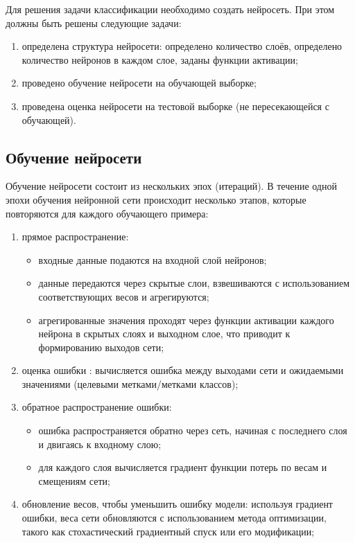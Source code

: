\documentclass[12pt]{report}
\begin{document}
Для решения задачи классификации необходимо создать нейросеть. При этом должны быть решены следующие задачи:
\begin{enumerate}
    \item определена структура нейросети: определено количество слоёв, определено количество нейронов в каждом слое, заданы функции активации;
    \item проведено обучение нейросети на обучающей выборке;
    \item проведена оценка нейросети на тестовой выборке (не пересекающейся с обучающей).
\end{enumerate}

\subsection{Обучение нейросети}

Обучение нейросети состоит из нескольких эпох (итераций). В течение одной эпохи обучения нейронной сети происходит несколько этапов, которые повторяются для каждого обучающего примера:
\begin{enumerate}
    \item прямое распространение:
    \begin{itemize}
        \item входные данные подаются на входной слой нейронов;
        \item данные передаются через скрытые слои, взвешиваются с использованием соответствующих весов и агрегируются;
        \item агрегированные значения проходят через функции активации каждого нейрона в скрытых слоях и выходном слое, что приводит к формированию выходов сети;
    \end{itemize}
    \item  оценка ошибки : вычисляется ошибка между выходами сети и ожидаемыми значениями (целевыми метками/метками классов);
    \item обратное распространение ошибки:
    \begin{itemize}
        \item ошибка распространяется обратно через сеть, начиная с последнего слоя и двигаясь к входному слою;
        \item для каждого слоя вычисляется градиент функции потерь по весам и смещениям сети;
    \end{itemize}
    \item обновление весов, чтобы уменьшить ошибку модели: используя градиент ошибки, веса сети обновляются с использованием метода оптимизации, такого как стохастический градиентный спуск или его модификации;
\end{enumerate}
\end{document}
